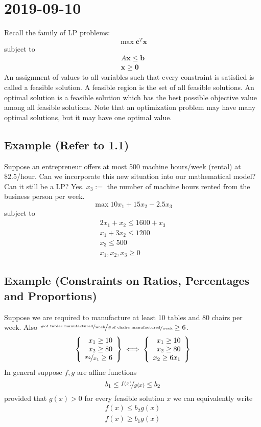 \section{2019-09-10}
Recall the family of LP problems:
\[\max \mathbf{c}^T\mathbf{x}\]
subject to
\begin{align*}
    A\mathbf{x}\le \mathbf{b}\\
    \mathbf{x}\ge \mathbf{0}
\end{align*}
An assignment of values to all variables such that every
constraint is satisfied is called a feasible solution.
A feasible region is the set of all feasible solutions.
An optimal solution is a feasible solution which has the best
possible objective value among all feasible solutions.
Note that an optimization problem may have many optimal
solutions, but it may have one optimal value.
\subsection{Example (Refer to 1.1)}
Suppose an entrepreneur offers at most 500 machine hours/week
(rental) at \$2.5/hour. Can we incorporate this new situation
into our mathematical model? Can it still be a LP? Yes.
$x_3:=$ the number of machine hours rented from the business
person per week.
\[\max 10x_1+15x_2-2.5x_3\]
subject to
\begin{align*}
    2x_1+x_2\le 1600+x_3\\
    x_1+3x_2\le 1200\\
    x_3\le 500\\
    x_1,x_2,x_3\ge 0
\end{align*}

\subsection{Example (Constraints on Ratios, Percentages and Proportions)}
Suppose we are required to manufacture at least 10 tables and
80 chairs per week. Also 
$\nicefrac{\nicefrac{\text{\#of tables manufactured}}{\text{week}}}
{\nicefrac{\text{\#of chairs manufactured}}{\text{week}}}
\ge 6$.
\[
   \left\{\begin{array}{r}
        x_1\ge 10\\
        x_2\ge 80\\
        \nicefrac{x_2}{x_1}\ge 6
    \end{array}\right\}
    \iff
    \left\{\begin{array}{r}
        x_1\ge 10\\
        x_2\ge 80\\
        x_2\ge 6x_1
    \end{array}\right\}
\]
In general suppose $f,g$ are affine functions
\[
    b_1\le \nicefrac{f(x)}{g(x)}\le b_2
\]
provided that $g(x)>0$ for every feasible solution $x$ we
can equivalently write
\begin{align*}
    f(x)\le b_2 g(x)\\
    f(x)\ge b_1 g(x)
\end{align*}

